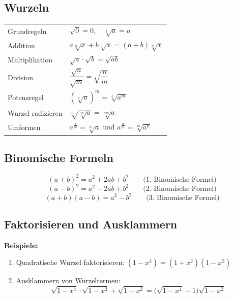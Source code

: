 \documentclass[../zusammenfassung_AN.tex]{subfiles}
\begin{document}
	\subsection{Wurzeln}
	
	\begin{tcolorbox}[formelbox]
		\renewcommand{\arraystretch}{1.5}
		\begin{tabular}{ll}
			Grundregeln        & $\sqrt{0}=0,\quad \sqrt[1]{a}=a$ \\
			Addition           & $a\sqrt[n]{x}+b\sqrt[n]{x}=(a+b)\sqrt[n]{x}$ \\
			Multiplikation     & $\sqrt{a}\cdot\sqrt{b}=\sqrt{ab}$ \\
			Division           & $\dfrac{\sqrt{n}}{\sqrt{m}}=\sqrt{\dfrac{n}{m}}$ \\[6pt]
			Potenzregel        & $\left(\sqrt[n]{a}\right)^m=\sqrt[n]{a^m}$ \\
			Wurzel radizieren  & $\sqrt[n]{\sqrt[m]{a}}=\sqrt[nm]{a}$ \\
			Umformen           & $a^{\frac{1}{m}}=\sqrt[m]{a}$ \quad und \quad $a^{\frac{n}{m}}=\sqrt[m]{a^n}$ \\
		\end{tabular}
	\end{tcolorbox}
	
	\subsection{Binomische Formeln}
	
	\begin{tcolorbox}[dglbox, title={Binomische Formeln}]
		\[
		(a+b)^2 = a^2 + 2ab + b^2 \qquad \text{(1. Binomische Formel)}
		\]
		\[
		(a-b)^2 = a^2 - 2ab + b^2 \qquad \text{(2. Binomische Formel)}
		\]
		\[
		(a+b)(a-b) = a^2 - b^2 \qquad \text{(3. Binomische Formel)}
		\]
	\end{tcolorbox}
	
	\subsection{Faktorisieren und Ausklammern}
	
	\begin{tcolorbox}[hinweis]
		\textbf{Beispiele:}
		\begin{enumerate}[noitemsep]
			\item Quadratische Wurzel faktorisieren: \quad $(1-x^4) = (1+x^2)(1-x^2)$
			\item Ausklammern von Wurzeltermen:
			\[
			\sqrt{1-x^4}\cdot\sqrt{1-x^2}+\sqrt{1-x^2}
			=\bigl(\sqrt{1-x^4}+1\bigr)\sqrt{1-x^2}
			\]
		\end{enumerate}
	\end{tcolorbox}
	
\end{document}
